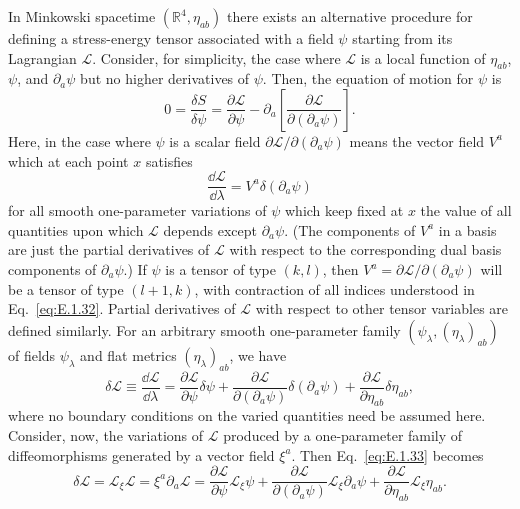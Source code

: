 In Minkowski spacetime \((\mathbb R^4,\eta_{ab})\) there exists an alternative
procedure for defining a stress-energy tensor associated with a field \(\psi\)
starting from its Lagrangian \(\mathcal L\). Consider, for simplicity, the case where
\(\mathcal L\) is a local function of \(\eta_{ab}\), \(\psi\), and
\(\partial_a\psi\) but no higher derivatives of \(\psi\). Then, the equation of
motion for \(\psi\) is
\begin{equation}
  0=\frac{\delta S}{\delta\psi}
    =\frac{\partial\mathcal L}{\partial\psi}
      -\partial_a\left[\frac{\partial\mathcal L}
        {\partial(\partial_a\psi)}\right].
  \tag{E.1.31}\label{eq:E.1.31}
\end{equation}
Here, in the case where \(\psi\) is a scalar field
\(\partial\mathcal L/\partial(\partial_a\psi)\) means the vector field \(V^a\)
which at each point \(x\) satisfies
\begin{equation}
  \frac{\dd\mathcal L}{\dd\lambda}=V^a\delta(\partial_a\psi)
  \tag{E.1.32}\label{eq:E.1.32}
\end{equation}
for all smooth one-parameter variations of \(\psi\) which keep fixed at \(x\) the
value of all quantities upon which \(\mathcal L\) depends except
\(\partial_a\psi\). (The components of \(V^a\) in a basis are just the partial
derivatives of \(\mathcal L\) with respect to the corresponding dual basis
components of \(\partial_a\psi\).) If \(\psi\) is a tensor of type \((k,l)\), then
\(V^a=\partial\mathcal L/\partial(\partial_a\psi)\) will be a tensor of type
\((l+1,k)\), with contraction of all indices understood in Eq.~\eqref{eq:E.1.32}.
Partial derivatives of \(\mathcal L\) with respect to other tensor variables are
defined similarly. For an arbitrary smooth one-parameter family
\((\psi_\lambda,(\eta_\lambda)_{ab})\) of fields \(\psi_\lambda\) and flat metrics
\((\eta_\lambda)_{ab}\), we have
\begin{equation}
  \delta\mathcal L\equiv\frac{\dd\mathcal L}{\dd\lambda}
    =\frac{\partial\mathcal L}{\partial\psi}\delta\psi
      +\frac{\partial\mathcal L}{\partial(\partial_a\psi)}
        \delta(\partial_a\psi)
      +\frac{\partial\mathcal L}{\partial\eta_{ab}}\delta\eta_{ab},
  \tag{E.1.33}\label{eq:E.1.33}
\end{equation}
where no boundary conditions on the varied quantities need be assumed here.
Consider, now, the variations of \(\mathcal L\) produced by a one-parameter family
of diffeomorphisms generated by a vector field \(\xi^a\). Then
Eq.~\eqref{eq:E.1.33} becomes
\begin{equation}
  \delta\mathcal L
    =\mathcal L_\xi\mathcal L
    =\xi^a\partial_a\mathcal L
    =\frac{\partial\mathcal L}{\partial\psi}\mathcal L_\xi\psi
      +\frac{\partial\mathcal L}{\partial(\partial_a\psi)}
        \mathcal L_\xi\partial_a\psi
      +\frac{\partial\mathcal L}{\partial\eta_{ab}}
        \mathcal L_\xi\eta_{ab}.
  \tag{E.1.34}\label{eq:E.1.34}
\end{equation}
